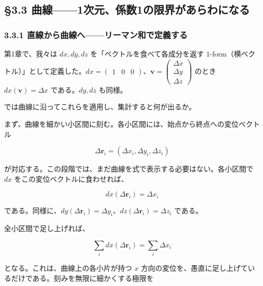 \documentclass[a4paper,12pt,openany]{book}
\begin{document}
\par\vspace{0.35em}\par

\hypertarget{ux66f2ux7dda1ux6b21ux5143ux4fc2ux65701ux306eux9650ux754cux304cux3042ux3089ux308fux306bux306aux308b}{%
\subsection{§3.3
曲線——1次元、係数1の限界があらわになる}\label{ux66f2ux7dda1ux6b21ux5143ux4fc2ux65701ux306eux9650ux754cux304cux3042ux3089ux308fux306bux306aux308b}}

\hypertarget{ux76f4ux7ddaux304bux3089ux66f2ux7ddaux3078ux30eaux30fcux30deux30f3ux548cux3067ux5b9aux7fa9ux3059ux308b}{%
\subsubsection{3.3.1
直線から曲線へ——リーマン和で定義する}\label{ux76f4ux7ddaux304bux3089ux66f2ux7ddaux3078ux30eaux30fcux30deux30f3ux548cux3067ux5b9aux7fa9ux3059ux308b}}

第1章で、我々は \(dx, dy, dz\) を「ベクトルを食べて各成分を返す
\(1\)-form（横ベクトル）」として定義した。\(dx = \begin{pmatrix}1&0&0\end{pmatrix}\)、\(\mathbf{v} = \begin{pmatrix}\Delta x\\\Delta y\\\Delta z\end{pmatrix}\)
のとき \(dx(\mathbf{v}) = \Delta x\) である。\(dy, dz\) も同様。

では曲線に沿ってこれらを適用し、集計すると何が出るか。

まず、曲線を細かい小区間に刻む。各小区間には、始点から終点への変位ベクトル

\[
\Delta\mathbf{r}_i=(\Delta x_i,\Delta y_i,\Delta z_i)
\]

が対応する。この段階では、まだ曲線を式で表示する必要はない。各小区間で
\(dx\) をこの変位ベクトルに食わせれば、

\[dx(\Delta\mathbf{r}_i)=\Delta x_i\]

である。同様に、\(dy(\Delta\mathbf{r}_i)=\Delta y_i\)、\(dz(\Delta\mathbf{r}_i)=\Delta z_i\)
である。

全小区間で足し上げれば、

\[
\sum_i dx(\Delta\mathbf{r}_i)=\sum_i \Delta x_i
\]

となる。これは、曲線上の各小片が持つ \(x\)
方向の変位を、愚直に足し上げているだけである。刻みを無限に細かくする極限を
\end{document}
